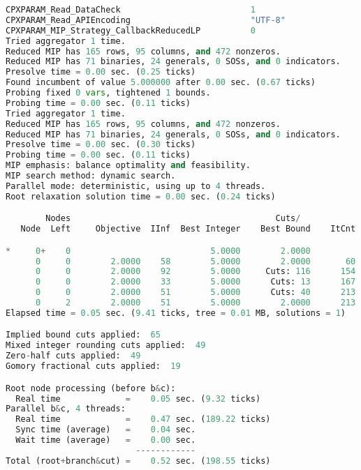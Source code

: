 \begin{lstlisting}[language=Python]
CPXPARAM_Read_DataCheck                          1
CPXPARAM_Read_APIEncoding                        "UTF-8"
CPXPARAM_MIP_Strategy_CallbackReducedLP          0
Tried aggregator 1 time.
Reduced MIP has 165 rows, 95 columns, and 472 nonzeros.
Reduced MIP has 71 binaries, 24 generals, 0 SOSs, and 0 indicators.
Presolve time = 0.00 sec. (0.25 ticks)
Found incumbent of value 5.000000 after 0.00 sec. (0.67 ticks)
Probing fixed 0 vars, tightened 1 bounds.
Probing time = 0.00 sec. (0.11 ticks)
Tried aggregator 1 time.
Reduced MIP has 165 rows, 95 columns, and 472 nonzeros.
Reduced MIP has 71 binaries, 24 generals, 0 SOSs, and 0 indicators.
Presolve time = 0.00 sec. (0.30 ticks)
Probing time = 0.00 sec. (0.11 ticks)
MIP emphasis: balance optimality and feasibility.
MIP search method: dynamic search.
Parallel mode: deterministic, using up to 4 threads.
Root relaxation solution time = 0.00 sec. (0.24 ticks)

        Nodes                                         Cuts/
   Node  Left     Objective  IInf  Best Integer    Best Bound    ItCnt     Gap

*     0+    0                            5.0000        2.0000            60.00%
      0     0        2.0000    58        5.0000        2.0000       60   60.00%
      0     0        2.0000    92        5.0000     Cuts: 116      154   60.00%
      0     0        2.0000    33        5.0000      Cuts: 13      167   60.00%
      0     0        2.0000    51        5.0000      Cuts: 40      213   60.00%
      0     2        2.0000    51        5.0000        2.0000      213   60.00%
Elapsed time = 0.05 sec. (9.41 ticks, tree = 0.01 MB, solutions = 1)

Implied bound cuts applied:  65
Mixed integer rounding cuts applied:  49
Zero-half cuts applied:  49
Gomory fractional cuts applied:  19

Root node processing (before b&c):
  Real time             =    0.05 sec. (9.32 ticks)
Parallel b&c, 4 threads:
  Real time             =    0.47 sec. (189.22 ticks)
  Sync time (average)   =    0.04 sec.
  Wait time (average)   =    0.00 sec.
                          ------------
Total (root+branch&cut) =    0.52 sec. (198.55 ticks)

\end{lstlisting}